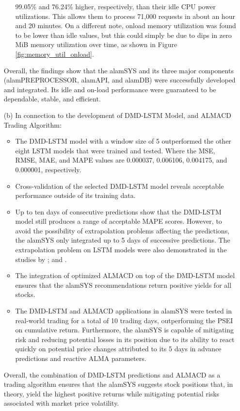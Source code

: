 \begin{itemize}
\begin{itemize}
            99.05\% and 76.24\% higher, respectively, than their idle CPU power 
            utilizations. This allows them to process 71,000 requests in about 
            an hour and 20 minutes. On a different note, onload memory utilization was 
            found to be lower than idle values, but this could simply be due to dips in 
            zero MiB memory utilization over time, as shown in Figure \ref{fig:memory_util_onload}.
        \end{itemize}
        Overall, the findings show that the alamSYS and its three major components 
        (alamPREPROCESSOR, alamAPI, and alamDB) were successfully developed and integrated. 
        Its idle and on-load performance were guaranteed to be dependable, stable, and efficient.
        \hfill \\

    \item[(b)] In connection to the development of DMD-LSTM Model, and ALMACD Trading Algorithm:
        \begin{itemize}
            \item The DMD-LSTM model with a window size of 5 outperformed the other eight 
            LSTM models that were trained and tested. 
            Where the MSE, RMSE, MAE, and MAPE values are 0.000037, 0.006106, 0.004175, and 0.000001,
            respectively.
            \item Cross-validation of the selected DMD-LSTM model reveals acceptable 
            performance outside of its training data.
            \item Up to ten days of consecutive predictions show that the DMD-LSTM model 
            still produces a range of acceptable MAPE scores. However, to avoid the possibility of 
            extrapolation problems affecting the predictions, the alamSYS only integrated up to 5 days of 
            successive predictions. The extrapolation problem on LSTM models were also demonstrated in the 
            studies by ; and .
            \item The integration of optimized ALMACD on top of the DMD-LSTM model ensures that the alamSYS 
            recommendations return positive yields for all stocks.
            \item The DMD-LSTM and ALMACD applications in alamSYS were tested in real-world trading for a total 
            of 10 trading days, outperforming the PSEI on cumulative return. Furthermore, the alamSYS is capable 
            of mitigating risk and reducing potential losses in its position due to its ability to react quickly 
            on potential price changes attributed to its 5 days in advance predictions and reactive ALMA parameters.
        \end{itemize}
        Overall, the combination of DMD-LSTM predictions and ALMACD as a trading algorithm ensures that the alamSYS 
        suggests stock positions that, in theory, yield the highest positive returns while mitigating potential risks 
        associated with market price volatility.
        \hfill \\


\end{itemize}
